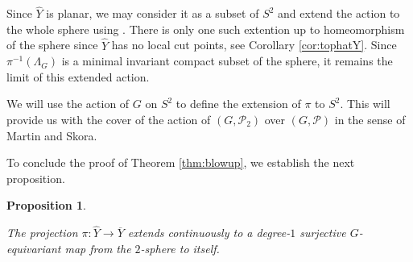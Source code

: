 \documentclass[11pt]{article}
\newtheorem{proposition}[theorem]{Proposition}
\theoremstyle{definition}
\newcommand\PP{\mathcal{P}}
\renewcommand\hat{\widehat}
\begin{document}
Since $\hat{Y}$ is planar, we may consider it as a subset of $S^2$ and  extend the action to the
whole sphere using \cite[Thm. 5.8]{ph:unifplanar}. There is only one such extention up to homeomorphism of the sphere since $\hat Y$ has no local cut points, see Corollary \ref{cor:tophatY}.  Since $\pi^{-1}(\Lambda_G)$ is a minimal invariant compact subset of the sphere, it remains the limit of this
extended action.

We will use the action of $G$ on $S^2$ to define the extension of $\pi$ to $S^2$. This will provide us with the cover of the action of $(G,\PP_2)$ over
$(G,\PP)$ in the sense of Martin and Skora.

\medskip

To conclude the proof of Theorem \ref{thm:blowup}, we establish the next proposition.

\begin{proposition}\label{prop:piext}
 
The projection $\pi:\hat{Y}\to \overline{Y}$ extends continuously to a degree-$1$ surjective $G$-equivariant map from the $2$-sphere to itself.    
\end{proposition}
\end{document}
